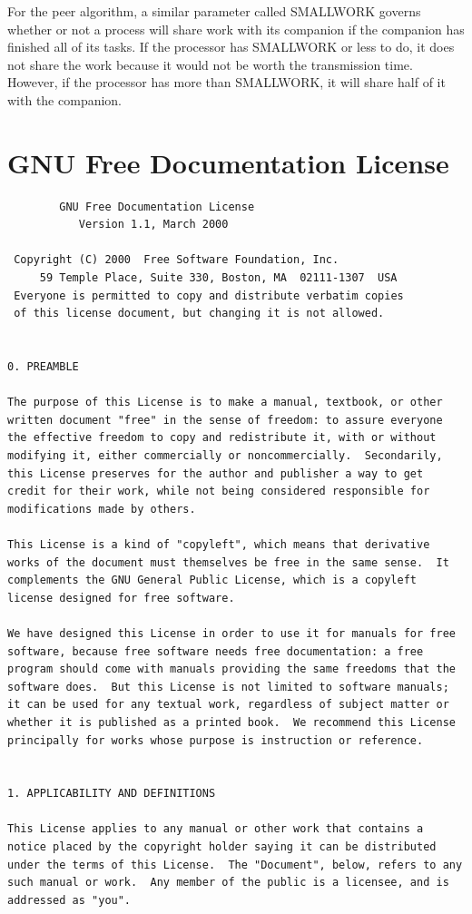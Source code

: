 \documentclass[12pt]{report}
\begin{document}
For the peer algorithm, a similar parameter called SMALLWORK governs whether
or not a process will share work with its companion if the
companion has finished all of its tasks.  If the processor has SMALLWORK or
less to do, it does not share the work because it would not be worth the
transmission time.  However, if the processor has more than SMALLWORK, it
will share half of it with the companion.

\chapter{GNU Free Documentation License}

\begin{verbatim}
		GNU Free Documentation License
		   Version 1.1, March 2000

 Copyright (C) 2000  Free Software Foundation, Inc.
     59 Temple Place, Suite 330, Boston, MA  02111-1307  USA
 Everyone is permitted to copy and distribute verbatim copies
 of this license document, but changing it is not allowed.


0. PREAMBLE

The purpose of this License is to make a manual, textbook, or other
written document "free" in the sense of freedom: to assure everyone
the effective freedom to copy and redistribute it, with or without
modifying it, either commercially or noncommercially.  Secondarily,
this License preserves for the author and publisher a way to get
credit for their work, while not being considered responsible for
modifications made by others.

This License is a kind of "copyleft", which means that derivative
works of the document must themselves be free in the same sense.  It
complements the GNU General Public License, which is a copyleft
license designed for free software.

We have designed this License in order to use it for manuals for free
software, because free software needs free documentation: a free
program should come with manuals providing the same freedoms that the
software does.  But this License is not limited to software manuals;
it can be used for any textual work, regardless of subject matter or
whether it is published as a printed book.  We recommend this License
principally for works whose purpose is instruction or reference.


1. APPLICABILITY AND DEFINITIONS

This License applies to any manual or other work that contains a
notice placed by the copyright holder saying it can be distributed
under the terms of this License.  The "Document", below, refers to any
such manual or work.  Any member of the public is a licensee, and is
addressed as "you".


\end{verbatim}
\end{document}
